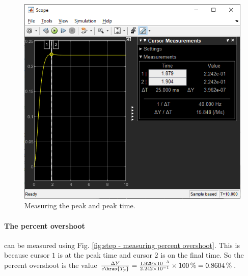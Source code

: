 \documentclass[12pt]{article}
\DeclarePairedDelimiter\brao()%
\begin{document}
\begin{figure}[h]
    \centering
    \includegraphics[width=\linewidth]{part01a_measuring_peak.png}
    \caption{Measuring the peak and peak time.}
    \label{fig:step - measuring peak}
\end{figure}

\paragraph{The percent overshoot} can be measured using Fig. \ref{fig:step - measuring percent overshoot}.
This is because cursor $1$ is at the peak time and cursor $2$ is on the final time.
So the percent overshoot is the value $\frac{\Delta Y}{c\brao{T_p}} = \frac{\num{1.929e-03}}{\num{2.242e-1}}\times\SI{100}\percent = \SI{0.8604}\percent$.
 
\end{document}
